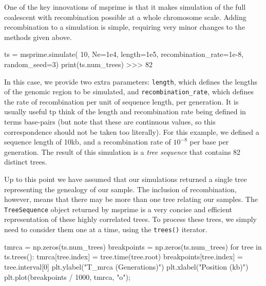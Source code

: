 \documentclass[graybox]{svmult}
\newcommand{\includenbimage}[1]{\begin{center}\texttt{[image: \#1]}\end{center}}
\begin{document}
One of the key innovations of msprime is that it makes simulation of the
full coalescent with recombination possible at a whole chromosome scale.
Adding recombination to a simulation is simple, requiring very minor
changes to the methods given above.

\begin{pythoncode}
ts = msprime.simulate(
    10, Ne=1e4, length=1e5, recombination_rate=1e-8, random_seed=3)
print(ts.num_trees)
>>> 82
\end{pythoncode}

    In this case, we provide two extra parameters: \texttt{length}, which
defines the lengths of the genomic region to be simulated, and
\texttt{recombination\_rate}, which defines the rate of recombination
per unit of sequence length, per generation. It is usually useful tp
think of the length and recombination rate being defined in terms
base-pairs (but note that these are continuous values, so this
correspondence should not be taken too literally). For this example, we
defined a sequence length of 10kb, and a recombination rate of
\(10^{-8}\) per base per generation. The result of this simulation is a
\emph{tree sequence} that contains 82 distinct trees.

Up to this point we have assumed that our simulations returned a single
tree representing the genealogy of our sample. The inclusion of
recombination, however, means that there may be more than one tree
relating our samples. The \texttt{TreeSequence} object returned by
msprime is a very concise and efficient representation of these highly
correlated trees. To process these trees, we simply need to consider
them one at a time, using the \texttt{trees()} iterator.

\begin{pythoncode}
tmrca = np.zeros(ts.num_trees)
breakpoints = np.zeros(ts.num_trees)
for tree in ts.trees():
    tmrca[tree.index] = tree.time(tree.root)
    breakpoints[tree.index] = tree.interval[0]
plt.ylabel("T_mrca (Generations)")
plt.xlabel("Position (kb)")
plt.plot(breakpoints / 1000, tmrca, "o");
\end{pythoncode}

\end{document}
